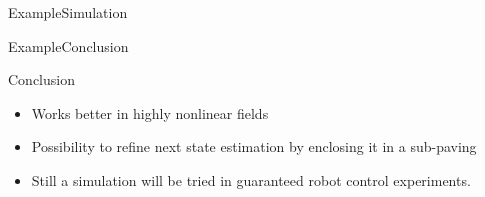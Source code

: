 \documentclass[9pt, xcolor={usenames, dvipsnames}]{beamer}
\begin{document}
			\begin{frame}{Example}{Simulation}
				\centering
				\begin{figure}
				\end{figure}
			\end{frame}

			\begin{frame}{Example}{Conclusion}
				\centering
				\begin{minipage}{0.6\textwidth}
					\begin{block}{Conclusion}
						\begin{itemize}
							\item Works better in highly nonlinear fields
							\item Possibility to refine next state estimation by enclosing it in a sub-paving
							\item Still a simulation will be tried in guaranteed robot control experiments.
						\end{itemize}
					\end{block}
				\end{minipage}
			\end{frame}
\end{document}
